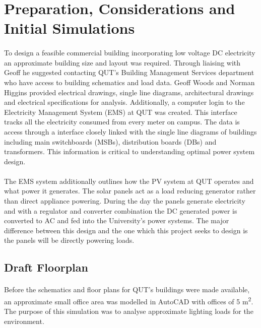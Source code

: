 \section{Preparation, Considerations and Initial Simulations}

\paragraph{}
To design a feasible commercial building incorporating low voltage DC electricity an approximate building size and layout was required. Through liaising with Geoff he suggested contacting QUT's Building Management Services department who have access to building schematics and load data. Geoff Woods and Norman Higgins provided electrical drawings, single line diagrams, architectural drawings and electrical specifications for analysis. Additionally, a computer login to the Electricity Management System (EMS) at QUT was created. This interface tracks all the electricity consumed from every meter on campus. The data is access through a interface closely linked with the single line diagrams of buildings including main switchboards (MSBs), distribution boards (DBs) and transformers. This information is critical to understanding optimal power system design. 

\paragraph{}
The EMS system additionally outlines how the PV system at QUT operates and what power it generates. The solar panels act as a load reducing generator rather than direct appliance powering. During the day the panels generate electricity and with a regulator and converter combination the DC generated power is converted to AC and fed into the University's power systems. The major difference between this design and the one which this project seeks to design is the panels will be directly powering loads. 

\subsection{Draft Floorplan}

\paragraph{}
Before the schematics and floor plans for QUT's buildings were made available, an approximate small office area was modelled in AutoCAD with offices of 5 \si{m^2}. The purpose of this simulation was to analyse approximate lighting loads for the environment.   

